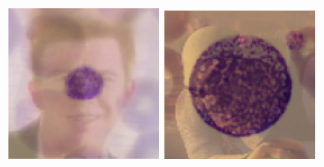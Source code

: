 \documentclass[11pt]{article}
\begin{document}
\begin{figure}[H]
    \centering
    \begin{minipage}{0.2\textwidth}
        \centering
        \includegraphics[width=\linewidth]{images/outlier1.png}
    \end{minipage}
    \hspace{2cm}
    \begin{minipage}{0.2\textwidth}
        \centering
        \includegraphics[width=\linewidth]{images/outlier2.png}
    \end{minipage}
\end{figure}
\end{document}
